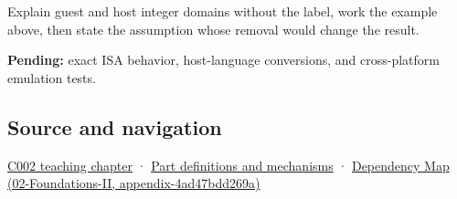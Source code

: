 Explain guest and host integer domains without the label, work the example above, then state the assumption whose removal would change the result.

\textbf{Pending:} exact ISA behavior, host-language conversions, and cross-platform emulation tests.

\subsection{Source and navigation}\label{appendix-33e7a011b684-source-and-navigation}

\hyperref[01-foundations-i-ch001-arithmetic-becomes-a-policy]{C002 teaching chapter} · \hyperref[appendix-fd090d982a15]{Part definitions and mechanisms} · \href{../02-Foundations-II/main.pdf\#nameddest=appendix-4ad47bdd269a}{Dependency Map (02-Foundations-II, appendix-4ad47bdd269a)}

